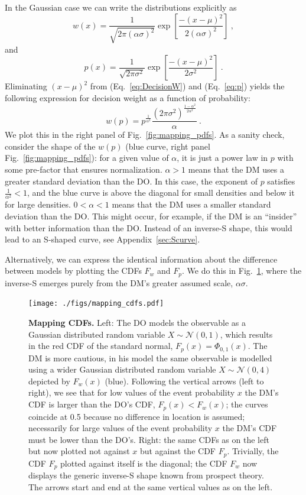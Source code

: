 \documentclass[a4paper, 12pt]{article}
\newcommand{\elabel}[1]{\label{eq:#1}}
\newcommand{\eref}[1]{(Eq.~\ref{eq:#1})}
\newcommand{\flabel}[1]{\label{fig:#1}}
\newcommand{\fref}[1]{Fig.~\ref{fig:#1}}
\newcommand{\Appref}[1]{Appendix~\ref{sec:#1}}
\newcommand{\be}{\begin{equation}}
\newcommand{\ee}{\end{equation}}
\newcommand{\ND}{\mathcal{N}} %
\begin{document}
In the Gaussian case we can write the distributions explicitly as
\be
w(x)=\frac{1}{\sqrt{2\pi (\alpha \sigma)^2}}\exp\left[\frac{-(x -\mu )^2}{2 (\alpha \sigma)^2}\right]~,
\elabel{DecisionW}
\ee
and
\be
p(x)=\frac{1}{\sqrt{2\pi \sigma^2}}\exp\left[\frac{-(x -\mu )^2}{2 \sigma^2}\right] ~.
\elabel{p}
\ee
Eliminating $(x-\mu)^2$ from \eref{DecisionW} and \eref{p} yields the following expression for decision weight as a function of probability:
\be
w(p)= p^{\frac{1}{\alpha^2}} \frac{\left(2\pi\sigma^2\right)^{\frac{1-\alpha^2}{2\alpha^2}}}{\alpha} ~.
\elabel{w_of_p}
\ee
We plot this in the right panel of \fref{mapping_pdfs}. As a sanity check, consider the shape of the $w(p)$ (blue curve, right panel \fref{mapping_pdfs}): for a given value of $\alpha$, it is just a power law in $p$ with some pre-factor that ensures normalization. $\alpha>1$ means that the DM uses a greater standard deviation than the DO. In this case, the exponent of $p$ satisfies $\frac{1}{\alpha^2}<1$, and the blue curve is above the diagonal for small densities and below it for large densities. $0<\alpha<1$ means that the DM uses a smaller standard deviation than the DO. This might occur, for example, if the DM is an ``insider'' with better information than the DO. Instead of an inverse-S shape, this would lead to an S-shaped curve, see \Appref{Scurve}.

Alternatively, we can express the identical information about the difference between models by plotting the CDFs $F_w$ and $F_p$. We do this in \fref{mapping_cdfs}, where the inverse-S emerges purely from the DM's greater assumed scale, $\alpha \sigma$.
\begin{figure}[!htb]
\centering
\texttt{[image: ./figs/mapping\_cdfs.pdf]}
\caption{\textbf{Mapping CDFs.}
Left: The DO models the observable as a Gaussian distributed random variable $X \sim \ND(0,1)$, which results in the red CDF of the standard normal, $F_p(x) = \Phi_{0,1}(x)$. The DM is more cautious, in his model the same observable is modelled using a wider Gaussian distributed random variable $X \sim \ND(0,4)$ depicted by $F_w(x)$ (blue).
%
Following the vertical arrows (left to right), we see that for low values of the event probability $x$ the DM's CDF is larger than the DO's CDF, $F_p(x) < F_w(x)$; the curves coincide at 0.5 because no difference in location is assumed; necessarily for large values of the event probability $x$ the DM's CDF must be lower than the DO's.
Right: the same CDFs as on the left but now plotted not against $x$ but against the CDF $F_p$. Trivially, the CDF $F_p$ plotted against itself is the diagonal; the CDF $F_w$ now displays the generic inverse-S shape known from prospect theory. The arrows start and end at the same vertical values as on the left.
}
\flabel{mapping_cdfs}
\end{figure}
\end{document}
